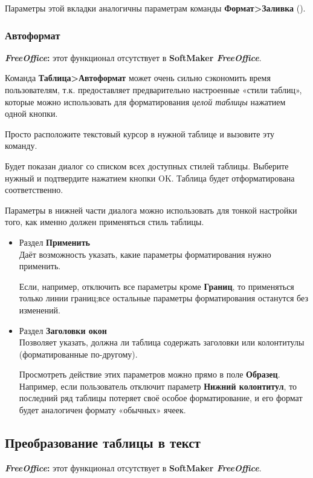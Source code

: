 ﻿\documentclass[a4paper,10pt]{article}
\begin{document}
Параметры этой вкладки аналогичны параметрам команды \textbf{Формат>Заливка} ().

\subsubsection{Автоформат}
\begin{mdframed}[backgroundcolor=pink!50]
\textbf{\textit{FreeOffice}:} этот функционал отсутствует в \textbf{SoftMaker \textit{FreeOffice}}.
\end{mdframed}

Команда \textbf{Таблица>Автоформат} может очень сильно сэкономить время пользователям, т.к. предоставляет предварительно настроенные «стили таблиц», которые можно использовать для форматирования \textit{целой таблицы} нажатием одной кнопки.

Просто расположите текстовый курсор в нужной таблице и вызовите эту команду.

Будет показан диалог со списком всех доступных стилей таблицы. Выберите нужный и подтвердите нажатием кнопки OK. Таблица будет отформатирована соответственно.

Параметры в нижней части диалога можно использовать для тонкой настройки того, как именно должен применяться стиль таблицы.

\begin{itemize}
 \item Раздел \textbf{Применить}\\
 Даёт возможность указать, какие параметры форматирования нужно применить.
 
 Если, например, отключить все параметры кроме \textbf{Границ}, то применяться только линии границ;все остальные параметры форматирования останутся без изменений.
 \item Раздел \textbf{Заголовки окон}\\
 Позволяет указать, должна ли таблица содержать заголовки или колонтитулы (форматированные по-другому).
 
 Просмотреть действие этих параметров можно прямо в поле \textbf{Образец}. Например, если пользователь отключит параметр \textbf{Нижний колонтитул}, то последний ряд таблицы потеряет своё особое форматирование, и его формат будет аналогичен формату «обычных» ячеек. 
\end{itemize}

\subsection{Преобразование таблицы в текст}
\begin{mdframed}[backgroundcolor=pink!50]
\textbf{\textit{FreeOffice}:} этот функционал отсутствует в \textbf{SoftMaker \textit{FreeOffice}}.
\end{mdframed}
\end{document}
